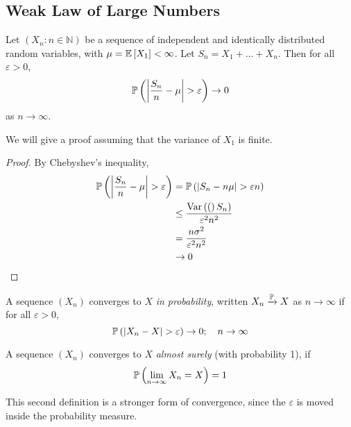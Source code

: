 \documentclass{article}
\begin{document}
\subsection{Weak Law of Large Numbers}
\begin{theorem}
    Let $(X_n \colon n \in \mathbb N)$ be a sequence of independent and identically distributed random variables, with $\mu = \mathbb{E}\left[{X_1}\right] < \infty$. Let $S_n = X_1 + \dots + X_n$. Then for all $\varepsilon > 0$,
    \[ \mathbb{P}\left({\abs{\frac{S_n}{n} - \mu} > \varepsilon}\right) \to 0 \]
    as $n \to \infty$.
\end{theorem}
\noindent We will give a proof assuming that the variance of $X_1$ is finite.
\begin{proof}
    By Chebyshev's inequality,
    \begin{align*}
        \mathbb{P}\left({\abs{\frac{S_n}{n} - \mu} > \varepsilon}\right) &= \mathbb{P}\left({\abs{S_n - n\mu} > \varepsilon n}\right) \\
        &\leq \frac{\operatorname{Var}\left({(}\right)S_n)}{\varepsilon^2 n^2} \\
        &= \frac{n\sigma^2}{\varepsilon^2 n^2} \\
        &\to 0
    \end{align*}
\end{proof}
\begin{definition}
    A sequence $(X_n)$ converges to $X$ \textit{in probability}, written $X_n \xrightarrow{\mathbb P} X$ as $n \to \infty$ if for all $\varepsilon > 0$,
    \[ \mathbb{P}\left({\abs{X_n - X} > \varepsilon}\right) \to 0;\quad n \to \infty \]
\end{definition}
\begin{definition}
    A sequence $(X_n)$ converges to $X$ \textit{almost surely} (with probability 1), if
    \[ \mathbb{P}\left({\lim_{n \to \infty} X_n = X }\right) = 1 \]
\end{definition}
\noindent This second definition is a stronger form of convergence, since the $\varepsilon$ is moved inside the probability measure.
\end{document}
